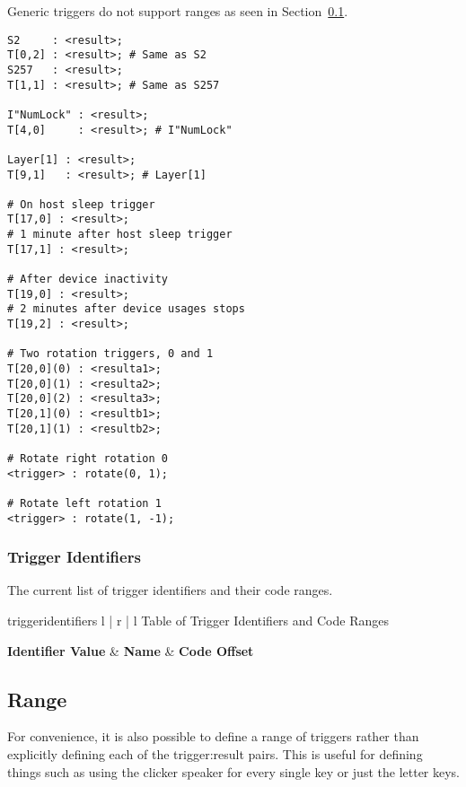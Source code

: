 \documentclass{kiibohd-template}
\begin{document}
Generic triggers do not support ranges as seen in Section~\ref{subsection:Range}.

\begin{lstlisting}
S2     : <result>;
T[0,2] : <result>; # Same as S2
S257   : <result>;
T[1,1] : <result>; # Same as S257

I"NumLock" : <result>;
T[4,0]     : <result>; # I"NumLock"

Layer[1] : <result>;
T[9,1]   : <result>; # Layer[1]

# On host sleep trigger
T[17,0] : <result>;
# 1 minute after host sleep trigger
T[17,1] : <result>;

# After device inactivity
T[19,0] : <result>;
# 2 minutes after device usages stops
T[19,2] : <result>;

# Two rotation triggers, 0 and 1
T[20,0](0) : <resulta1>;
T[20,0](1) : <resulta2>;
T[20,0](2) : <resulta3>;
T[20,1](0) : <resultb1>;
T[20,1](1) : <resultb2>;

# Rotate right rotation 0
<trigger> : rotate(0, 1);

# Rotate left rotation 1
<trigger> : rotate(1, -1);
\end{lstlisting}


\subsubsection{Trigger Identifiers}
\label{subsubsec:Trigger_Identifiers}

The current list of trigger identifiers and their code ranges.

\begin{ltable}{triggeridentifiers}{ l | r | l }{Table of Trigger Identifiers and Code Ranges}

\textbf{Identifier Value} & \textbf{Name} & \textbf{Code Offset} \\
\hline
\hline


\end{ltable}


\subsection{Range}
\label{subsection:Range}

For convenience, it is also possible to define a range of triggers rather than explicitly defining each of the trigger:result pairs.
This is useful for defining things such as using the clicker speaker for every single key or just the letter keys.
\end{document}
